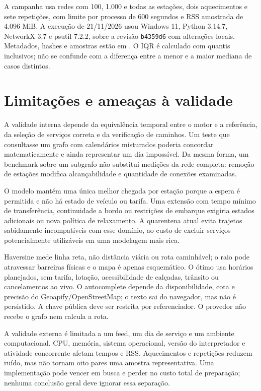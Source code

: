 \documentclass[12pt]{article}
\newcommand{\code}[1]{\texttt{#1}}
\begin{document}
A campanha usa redes com 100, 1.000 e todas as estações, dois aquecimentos e sete repetições, com limite por processo de 600 segundos e RSS amostrada de 4.096 MiB. A execução de 21/11/2026 usou Windows 11, Python 3.14.7, NetworkX 3.7 e psutil 7.2.2, sobre a revisão \code{b4359d6} com alterações locais. Metadados, hashes e amostras estão em . O IQR é calculado com quantis inclusivos; não se confunde com a diferença entre a menor e a maior mediana de casos distintos.



\section{Limitações e ameaças à validade}
A validade interna depende da equivalência temporal entre o motor e a referência, da seleção de serviços correta e da verificação de caminhos. Um teste que consultasse um grafo com calendários misturados poderia concordar matematicamente e ainda representar um dia impossível. Da mesma forma, um benchmark sobre um subgrafo não substitui medições da rede completa: remoção de estações modifica alcançabilidade e quantidade de conexões examinadas.

O modelo mantém uma única melhor chegada por estação porque a espera é permitida e não há estado de veículo ou tarifa. Uma extensão com tempo mínimo de transferência, continuidade a bordo ou restrições de embarque exigiria estados adicionais ou nova política de relaxamento. A quarentena atual evita trajetos sabidamente incompatíveis com esse domínio, ao custo de excluir serviços potencialmente utilizáveis em uma modelagem mais rica.

Haversine mede linha reta, não distância viária ou rota caminhável; o raio pode atravessar barreiras físicas e o mapa é apenas esquemático. O ótimo usa horários planejados, sem tarifa, lotação, acessibilidade de calçadas, trânsito ou cancelamentos ao vivo. O autocomplete depende da disponibilidade, cota e precisão do Geoapify/OpenStreetMap; o texto sai do navegador, mas não é persistido. A chave pública deve ser restrita por referenciador. O provedor não recebe o grafo nem calcula a rota.

A validade externa é limitada a um feed, um dia de serviço e um ambiente computacional. CPU, memória, sistema operacional, versão do interpretador e atividade concorrente afetam tempos e RSS. Aquecimentos e repetições reduzem ruído, mas não tornam oito pares uma amostra representativa. Uma implementação pode vencer em busca e perder no custo total de preparação; nenhuma conclusão geral deve ignorar essa separação.
\end{document}
